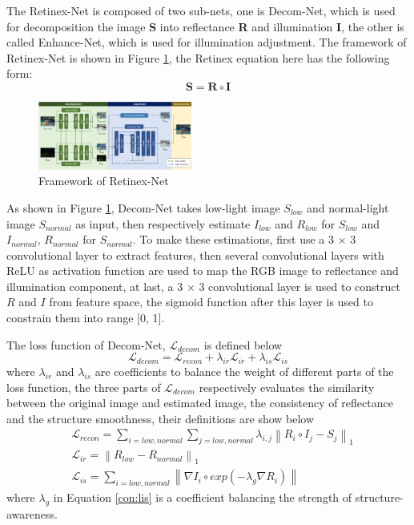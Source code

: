 \documentclass[10pt,twocolumn,letterpaper]{article}
\begin{document}
The Retinex-Net is composed of two sub-nets, one is Decom-Net, which is used for decomposition the image \textbf{S} into reflectance \textbf{R} and illumination \textbf{I}, the other is called Enhance-Net, which is used for illumination adjustment. The framework of Retinex-Net is shown in Figure \ref{fig:Retinex-Net}, the Retinex equation here has the following form:
\begin{equation}
    \mathbf{S = R \circ I} 
\end{equation}
\begin{figure}[t]
    \centering
    \includegraphics[width=0.45\textwidth]{latex/Retinex Net.png}
    \caption{Framework of Retinex-Net \cite{Wei2018Deep}}
    \label{fig:Retinex-Net}
\end{figure}

As shown in Figure \ref{fig:Retinex-Net}, Decom-Net takes low-light image $S_{low}$ and normal-light image $S_{normal}$ as input, then respectively estimate $ I_{low}$ and $ R_{low}$ for $ S_{low}$ and  $I_{normal}$, $ R_{normal}$ for $ S_{normal}$. To make these estimations, first use a 3 $\times$ 3 convolutional layer to extract features, then several convolutional layers with ReLU as activation function are used to map the RGB image to reflectance and illumination component, at last, a 3 $\times$ 3 convolutional layer is used to construct $R$ and $I$ from feature space, the sigmoid function after this layer is used to constrain them into range [0, 1].

The loss function of Decom-Net, $\mathcal{L}_{decom}$ is defined below
\begin{equation}
    \mathcal{L}_{decom} = \mathcal{L}_{recon} + \lambda_{ir}\mathcal{L}_{ir} + \lambda_{is}\mathcal{L}_{is}
\end{equation}
where $\lambda_{ir}$ and $\lambda_{is}$ are coefficients to balance the weight of different parts of the loss function, the three parts of $\mathcal{L}_{decom}$ respectively evaluates the similarity between the original image and estimated image, the consistency of reflectance and the structure smoothness, their definitions are show below
\begin{align}
    &\mathcal{L}_{recon} = \sum_{i=low, normal}\sum_{j=low, normal}\lambda_{i,j}\left\|R_i \circ I_j - S_j\right\|_1 \\
    &\mathcal{L}_{ir}= \left\|R_{low} - R_{normal}\right\|_1 \\
    &\mathcal{L}_{is}= \sum_{i=low,normal}\left\|\nabla I_i \circ exp(-\lambda_g\nabla R_i)\right\| \label{con:lis}
\end{align}
where $\lambda_g$ in Equation \ref{con:lis} is a coefficient balancing the strength of structure-awareness. 
\end{document}
